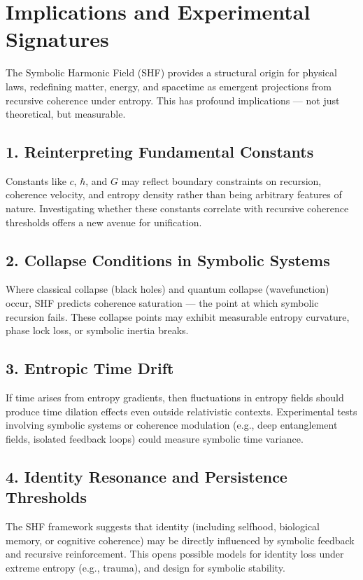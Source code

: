 \documentclass[12pt]{article}
\begin{document}
\section{Implications and Experimental Signatures}

The Symbolic Harmonic Field (SHF) provides a structural origin for physical laws, redefining matter, energy, and spacetime as emergent projections from recursive coherence under entropy. This has profound implications — not just theoretical, but measurable.

\subsection*{1. Reinterpreting Fundamental Constants}

Constants like \(c\), \(\hbar\), and \(G\) may reflect boundary constraints on recursion, coherence velocity, and entropy density rather than being arbitrary features of nature. Investigating whether these constants correlate with recursive coherence thresholds offers a new avenue for unification.

\subsection*{2. Collapse Conditions in Symbolic Systems}

Where classical collapse (black holes) and quantum collapse (wavefunction) occur, SHF predicts coherence saturation — the point at which symbolic recursion fails. These collapse points may exhibit measurable entropy curvature, phase lock loss, or symbolic inertia breaks.

\subsection*{3. Entropic Time Drift}

If time arises from entropy gradients, then fluctuations in entropy fields should produce time dilation effects even outside relativistic contexts. Experimental tests involving symbolic systems or coherence modulation (e.g., deep entanglement fields, isolated feedback loops) could measure symbolic time variance.

\subsection*{4. Identity Resonance and Persistence Thresholds}

The SHF framework suggests that identity (including selfhood, biological memory, or cognitive coherence) may be directly influenced by symbolic feedback and recursive reinforcement. This opens possible models for identity loss under extreme entropy (e.g., trauma), and design for symbolic stability.
\end{document}
